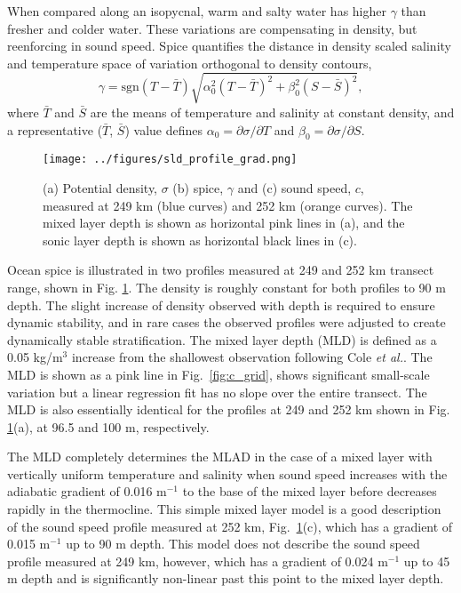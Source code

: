 \documentclass[preprint,NumberedRefs]{JASA}
\begin{document}
When compared along an isopycnal, warm and salty water has higher $\gamma$ than fresher and colder water. These variations are compensating in density, but reenforcing in sound speed. Spice quantifies the distance in density scaled salinity and temperature space of variation orthogonal to density contours,
\begin{equation}
    \gamma=\textrm{sgn}(T-\bar{T}) \sqrt{\alpha_0^2(T-\bar{T})^2 +\beta_0^2(S-\bar{S})^2},
    \label{eq:gamma}
\end{equation}
where $\bar{T}$ and $\bar{S}$ are the means of temperature and salinity at constant density, and a representative ($\bar{T}$, $\bar{S}$) value defines $\alpha_0=\partial \sigma / \partial T$ and $\beta_0=\partial \sigma / \partial S$.

\begin{figure}
\texttt{[image: ../figures/sld\_profile\_grad.png]}
    \caption{\label{fig:profiles}{(a) Potential density, $\sigma$ (b) spice, $\gamma$ and (c) sound speed, $c$, measured at 249 km (blue curves) and 252 km (orange curves). The mixed layer depth is shown as horizontal pink lines in (a), and the sonic layer depth is shown as horizontal black lines in (c).}}
\end{figure}
Ocean spice is illustrated in two profiles measured at 249 and 252 km transect range, shown in Fig. \ref{fig:profiles}. The density is roughly constant for both profiles to 90 m depth. The slight increase of density observed with depth is required to ensure dynamic stability, and in rare cases the observed profiles were adjusted to create dynamically stable stratification\citep{barker2017stabilizing}. The mixed layer depth (MLD) is defined as a 0.05 kg/m$^3$ increase from the shallowest observation following Cole \emph{et al.}\cite{cole2010seasonal}. The MLD is shown as a pink line in Fig.~\ref{fig:c_grid}, shows significant small-scale variation but a linear regression fit has no slope over the entire transect. The MLD is also essentially identical for the profiles at 249 and 252 km shown in Fig. \ref{fig:profiles}(a), at 96.5 and 100 m, respectively.

The MLD completely determines the MLAD in the case of a mixed layer with vertically uniform temperature and salinity when sound speed increases with the adiabatic gradient of 0.016 m$^{-1}$ to the base of the mixed layer before decreases rapidly in the thermocline. This simple mixed layer model is a good description of the sound speed profile measured at 252 km, Fig.~\ref{fig:profiles}(c), which has a gradient of 0.015 m$^{-1}$ up to 90 m depth. This model does not describe the sound speed profile measured at 249 km, however, which has a gradient of 0.024 m$^{-1}$ up to 45 m depth and is significantly non-linear past this point to the mixed layer depth.
\end{document}
